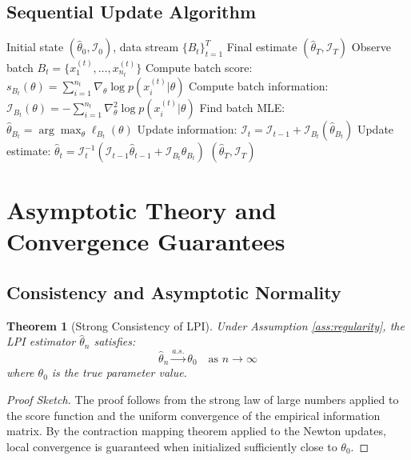 \documentclass[11pt]{article}
\newtheorem{theorem}{Theorem}
\begin{document}
\subsection{Sequential Update Algorithm}

\begin{algorithm}[h]
\caption{LPI Sequential Update}
\label{alg:lpi_sequential}
\begin{algorithmic}[1]
\Require Initial state $(\hat{\theta}_0, \mathcal{I}_0)$, data stream $\{B_t\}_{t=1}^T$
\Ensure Final estimate $(\hat{\theta}_T, \mathcal{I}_T)$
\State Observe batch $B_t = \{x_1^{(t)}, \ldots, x_{n_t}^{(t)}\}$
\State Compute batch score: $s_{B_t}(\theta) = \sum_{i=1}^{n_t} \nabla_\theta \log p(x_i^{(t)}|\theta)$
\State Compute batch information: $\mathcal{I}_{B_t}(\theta) = -\sum_{i=1}^{n_t} \nabla^2_\theta \log p(x_i^{(t)}|\theta)$
\State Find batch MLE: $\hat{\theta}_{B_t} = \arg\max_\theta \ell_{B_t}(\theta)$
\State Update information: $\mathcal{I}_t = \mathcal{I}_{t-1} + \mathcal{I}_{B_t}(\hat{\theta}_{B_t})$
\State Update estimate: $\hat{\theta}_t = \mathcal{I}_t^{-1}(\mathcal{I}_{t-1}\hat{\theta}_{t-1} + \mathcal{I}_{B_t}\hat{\theta}_{B_t})$
\EndFor
\State \Return $(\hat{\theta}_T, \mathcal{I}_T)$
\end{algorithmic}
\end{algorithm}

\section{Asymptotic Theory and Convergence Guarantees}

\subsection{Consistency and Asymptotic Normality}

\begin{theorem}[Strong Consistency of LPI]
\label{thm:consistency}
Under Assumption \ref{ass:regularity}, the LPI estimator $\hat{\theta}_n$ satisfies:
\begin{equation}
\hat{\theta}_n \xrightarrow{a.s.} \theta_0 \quad \text{as } n \to \infty
\end{equation}
where $\theta_0$ is the true parameter value.
\end{theorem}

\begin{proof}[Proof Sketch]
The proof follows from the strong law of large numbers applied to the score function and the uniform convergence of the empirical information matrix. By the contraction mapping theorem applied to the Newton updates, local convergence is guaranteed when initialized sufficiently close to $\theta_0$.
\end{proof}
\end{document}
